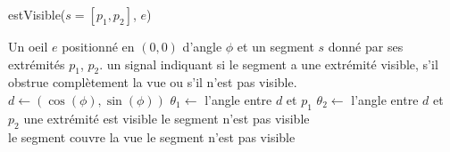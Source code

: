 \begin{algorithm}
  \caption{estVisible($s=[p_1, p_2]$, $e$)}
  \begin{algorithmic}[1] \label{algo:painter}
    \REQUIRE Un oeil $e$ positionné en $(0, 0)$ d'angle $\phi$ et un segment $s$
    donné par ses extrémités $p_1$, $p_2$.
    \ENSURE un signal indiquant si le segment a une extrémité visible,
    s'il obstrue complètement la vue ou s'il n'est pas visible.
    \STATE $d\leftarrow (\cos(\phi), \sin(\phi))$
    \STATE $\theta_1\leftarrow$ l'angle entre $d$ et $p_1$
    \STATE $\theta_2\leftarrow$ l'angle entre $d$ et $p_2$
    \IF{$\theta_1\in[-\pi/4, \pi/4]\lor \theta_2\in[-\pi/4, \pi/4]$}
    \RETURN \og{}une extrémité est visible\fg{}
    \RETURN \og le segment n'est pas visible \fg \\
    \ENDIF
    \RETURN \og le segment couvre la vue\fg
    \ELSE
    \RETURN \og le segment n'est pas visible \fg
    \ENDIF
  \end{algorithmic}
\end{algorithm}
